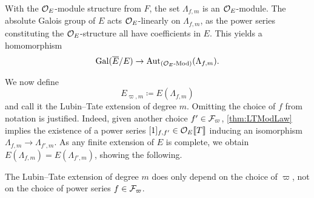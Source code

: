 \documentclass[../main.tex]{subfiles}
\begin{document}
With the $\mathcal{O}_E$-module structure from $F$, the set $\Lambda_{f,m}$ is an
$\mathcal{O}_E$-module. The absolute Galois group of $E$ acts $\mathcal{O}_E$-linearly on
$\Lambda_{f,m}$, as the power series constituting the $\mathcal{O}_E$-structure all
have coefficients in $E$. This yields a homomorphism 
\begin{equation} \label{eq:GaloisGroupToLambdaHom}
  \operatorname{Gal}(\overline E /E ) \to \operatorname{Aut}_{{({\mathcal{O}_E}\textnormal-\allowbreak\mathrm{Mod})}}(\Lambda_{f,m}).
\end{equation}

We now define 
\begin{equation*}
  E_{\varpi, m} \coloneq E(\Lambda_{f, m})
\end{equation*}
and call it the Lubin--Tate extension of degree $m$. 
Omitting the choice of $f$ from notation is justified. Indeed, given 
another choice $f' \in \mathcal{F}_\varpi$, \cref{thm:LTModLaw} implies the 
existence of a power series $[1]_{f,f'} \in \mathcal{O}_E\llbracket T \rrbracket$ inducing an
isomorphism $\Lambda_{f,m} \to \Lambda_{f',m}$. As any finite extension of $E$
is complete, we obtain $E(\Lambda_{f,m}) = E(\Lambda_{f',m})$, showing the following.
\begin{lem}\label{lem:FiniteLTExtensionIndepOfF}
  The Lubin--Tate extension of degree $m$ does only depend on the choice of $\varpi$,
  not on the choice of power series $f \in \mathcal{F}_\varpi$. 
\end{lem}
\end{document}
